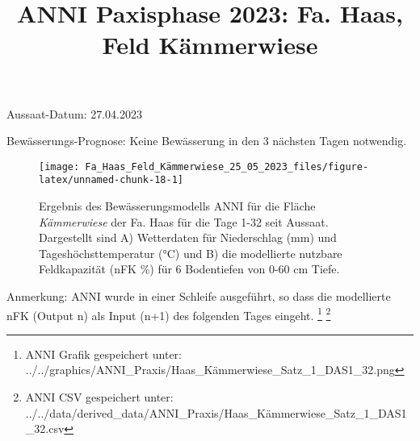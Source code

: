 \documentclass[
]{article}
\title{ANNI Paxisphase 2023: Fa. Haas, Feld Kämmerwiese}
\author{}
\date{\vspace{-2.5em}}
\begin{document}
\maketitle

Aussaat-Datum: 27.04.2023

Bewässerungs-Prognose: Keine Bewässerung in den 3 nächsten Tagen
notwendig.

\hfill\break

\begin{figure}[H]
\texttt{[image: Fa\_Haas\_Feld\_Kämmerwiese\_25\_05\_2023\_files/figure-latex/unnamed-chunk-18-1]} \caption{Ergebnis des Bewässerungsmodells ANNI für die Fläche \textit{Kämmerwiese} der Fa. Haas für die Tage 1-32 seit Aussaat. Dargestellt sind A) Wetterdaten für Niederschlag (mm) und Tageshöchsttemperatur (°C) und B) die modellierte nutzbare Feldkapazität (nFK \%) für 6 Bodentiefen von 0-60 cm Tiefe.}\label{fig:unnamed-chunk-18}
\end{figure}

Anmerkung: ANNI wurde in einer Schleife ausgeführt, so dass die
modellierte nFK (Output n) als Input (n+1) des folgenden Tages eingeht.
\footnote{ANNI Grafik gespeichert unter:
  ../../graphics/ANNI\_Praxis/Haas\_Kämmerwiese\_Satz\_1\_DAS1\_32.png}
\footnote{ANNI CSV gespeichert unter:
  ../../data/derived\_data/ANNI\_Praxis/Haas\_Kämmerwiese\_Satz\_1\_DAS1\_32.csv}
\end{document}
